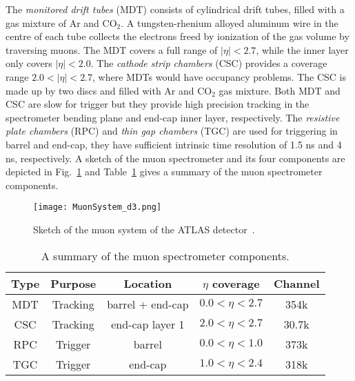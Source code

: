 The \textit{monitored drift tubes} (MDT) consists of cylindrical drift tubes, filled with a gas mixture of Ar and CO$_{2}$.
A tungsten-rhenium alloyed aluminum wire in the centre of each tube collects the electrons freed by ionization of the gas volume by traversing muons.
The MDT covers a full range of $|\eta| < 2.7$, while the inner layer only covers $|\eta| < 2.0$.
The \textit{cathode strip chambers} (CSC) provides a coverage range $2.0 < |\eta| < 2.7$, where MDTs would have occupancy problems.
The CSC is made up by two discs and filled with Ar and CO$_{2}$ gas mixture.
Both MDT and CSC are slow for trigger but they provide high precision tracking in the spectrometer bending plane and end-cap inner layer, respectively.
The \textit{resistive plate chambers} (RPC) and \textit{thin gap chambers} (TGC) are used for triggering in barrel and end-cap, they have sufficient intrinsic time resolution of 1.5 ns and 4 ns, respectively.
A sketch of the muon spectrometer and its four components are depicted in Fig.~\ref{fig:ae_muon_spectrometer} and Table~\ref{tab:ae_muon_spectrometer_components} gives a summary of the muon spectrometer components.

\begin{figure}[htbp]
    \begin{center}
        \texttt{[image: MuonSystem\_d3.png]}
        \caption{Sketch of the muon system of the ATLAS detector~\cite{Aad:2008zzm}.}
        \label{fig:ae_muon_spectrometer}
    \end{center}
\end{figure}

\begin{table}[htbp]
    \begin{center}
        {\footnotesize
            \begin{tabular}{ccccc}
                \hline
                \hline
                Type & Purpose  & Location         & $\eta$ coverage    & Channel\\
                \hline
                MDT  & Tracking & barrel + end-cap & $0.0 < \eta < 2.7$ & 354k\\
                CSC  & Tracking & end-cap layer 1  & $2.0 < \eta < 2.7$ & 30.7k\\
                RPC  & Trigger  & barrel           & $0.0 < \eta < 1.0$ & 373k\\
                TGC  & Trigger  & end-cap          & $1.0 < \eta < 2.4$ & 318k\\
                \hline
                \hline
            \end{tabular}
        }
    \end{center}
    \caption{A summary of the muon spectrometer components.}
    \label{tab:ae_muon_spectrometer_components}
\end{table}%

